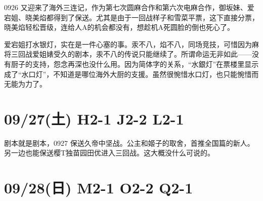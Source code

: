 0926 又迎来了海外三连记，作为第七次圆麻合作和第六次电麻合作，御坂妹、爱宕姐、晓美焰都得到了保送。尤其是由于一回战样子和雪菜平票，这下直接分票，晓美焰轻松晋级，连给人A的机会都没有，想趁机A死圆脸的倒也死心了。

爱宕姐打水银灯，实在是一件心塞的事。汞不八，焰不八，同场竞技，可惜因为麻将三回战爱姐婊受久的剧本，汞不八的传说只能继续了。所谓命运无非如此——没有厨子的支持，怨念再深也没什么用。因为简体字的关系，“水銀灯”在票楼里显示成了“水口灯”，不知道是哪位海外大厨的支援。虽然很惋惜水口灯，也只能惋惜而无能为力了。

\section{09/27(土) H2-1 J2-2 L2-1}


剧本就是剧本，0927 保送久帝中坚战。公主和姬子的取舍，首推全国篇的新人。另一边也能保送樱T独苗园田优进入三回战。这大概没什么可说的。

\section{09/28(日) M2-1 O2-2 Q2-1}


